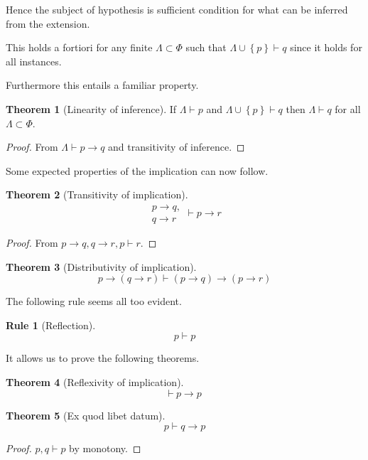 \documentclass{amsbook}
\newcommand{\setsm}[1]{\left\{#1\right\}}
\newcommand{\infers}{\mathrel\vdash}
\newcommand{\theorem}{\mathord\vdash\medspace}
\newcommand{\then}{\mathrel\rightarrow}
\theoremstyle{definition}
\newtheorem{subrule}[frule]{Rule}
\newtheorem{thm}{Theorem}[section]
\begin{document}
Hence the subject of hypothesis is sufficient condition for what can be inferred from the extension.

This holds a fortiori for any finite $\varLambda \subset \Phi$ such that $\varLambda \cup \setsm p \infers q$ since it holds for all instances.

Furthermore this entails a familiar property.

\begin{thm}[Linearity of inference]
    If $\varLambda \infers p$ and $\varLambda \cup \setsm p \infers q$ then $\varLambda \infers q$ for all $\varLambda \subset \Phi$.
    \begin{proof}
        From $\varLambda \infers p \then q$ and transitivity of inference.
    \end{proof}
\end{thm}

Some expected properties of the implication can now follow.

\begin{thm}[Transitivity of implication]
    $$\begin{aligned}
            p \then q, \\
            q \then r
        \end{aligned} \infers p \then r$$
    \begin{proof}
        From $p \then q, q \then r, p \infers r$.
    \end{proof}
\end{thm}

\begin{thm}[Distributivity of implication]
    $$p \then (q \then r) \infers (p \then q) \then (p \then r)$$
\end{thm}

The following rule seems all too evident.

\begin{subrule}[Reflection]
    $$p \infers p$$
\end{subrule}

It allows us to prove the following theorems.

\begin{thm}[Reflexivity of implication]
    $$\theorem p \then p$$
\end{thm}

\begin{thm}[Ex quod libet datum]
    $$p \infers q \then p$$
    \begin{proof}
        $p, q \infers p$ by monotony.
    \end{proof}
\end{thm}
\end{document}
